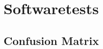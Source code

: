 \chapter{Softwaretests} \label{chap:softwaretests}



\section{Confusion Matrix} \label{sec:confusionmatrix}
